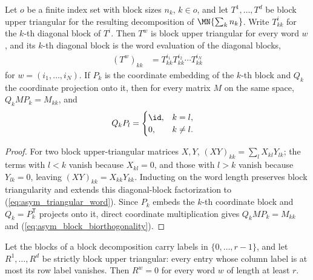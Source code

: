 \begin{lemma}
    \label{lem:asym_triangular}
    \leanok
    Let $o$ be a finite index set with block sizes $n_k$, $k\in o$, and let
    $T^1,\ldots,T^d$ be block upper triangular for the resulting
    decomposition of $\MN{\sum_k n_k}$. Write $T^i_{kk}$ for the $k$-th
    diagonal block of $T^i$. Then $T^w$ is block upper triangular for every
    word $w$, and its $k$-th diagonal block is the word evaluation of the
    diagonal blocks,
    \begin{align}
        (T^w)_{kk} & =T^{i_1}_{kk}T^{i_2}_{kk}\cdots T^{i_N}_{kk}
        \label{eq:asym_triangular_word}
    \end{align}
    for $w=(i_1,\ldots,i_N)$. If $P_k$ is the coordinate embedding of the
    $k$-th block and $Q_k$ the coordinate projection onto it, then for every
    matrix $M$ on the same space, $Q_kMP_k=M_{kk}$, and
    \begin{align}
        Q_kP_l & =\begin{cases}\id, & k=l,\\0, & k\ne l.\end{cases}
        \label{eq:asym_block_biorthogonality}
    \end{align}
\end{lemma}

\begin{proof}
    \leanok
    For two block upper-triangular matrices $X,Y$,
    $(XY)_{kk}=\sum_l X_{kl}Y_{lk}$; the terms with $l<k$ vanish because
    $X_{kl}=0$, and those with $l>k$ vanish because $Y_{lk}=0$, leaving
    $(XY)_{kk}=X_{kk}Y_{kk}$. Inducting on the word length preserves block
    triangularity and extends this diagonal-block factorization to
    (\ref{eq:asym_triangular_word}). Since $P_k$ embeds the $k$-th coordinate
    block and $Q_k=P_k^{\mathsf T}$ projects onto it, direct coordinate
    multiplication gives $Q_kMP_k=M_{kk}$ and
    (\ref{eq:asym_block_biorthogonality}).
\end{proof}

\begin{lemma}
    \label{lem:wordflags_strict_triangular_nilpotent}
    \leanok
    Let the blocks of a block decomposition carry labels in
    $\{0,\ldots,r-1\}$, and let $R^1,\ldots,R^d$ be strictly block upper
    triangular: every entry whose column label is at most its row label
    vanishes. Then $R^w=0$ for every word $w$ of length at least $r$.
\end{lemma}

